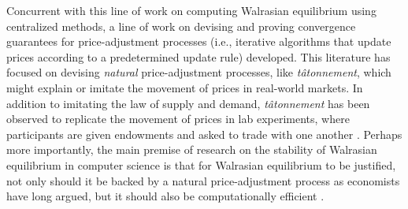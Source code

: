 Concurrent with this line of work on computing Walrasian equilibrium using centralized methods, a line of work on devising and proving 
convergence guarantees for price-adjustment processes (i.e., iterative algorithms that update prices according to a predetermined update rule) developed.
This literature has focused on devising \emph{natural\/} price-adjustment processes, like \emph{t\^atonnement}, which might explain or imitate the movement of prices in real-world markets.
In addition to imitating the law of supply and demand, \emph{t\^atonnement} has been observed to replicate the movement of prices in lab experiments, where participants are given endowments and asked to trade with one another \cite{gillen2020divergence}.
Perhaps more importantly, the main premise of research on the stability of Walrasian equilibrium in computer science 
is that for Walrasian equilibrium to be justified, not only should it be backed by a natural price-adjustment process as economists have long argued, but it should also be computationally efficient \cite{AGT-book}.


